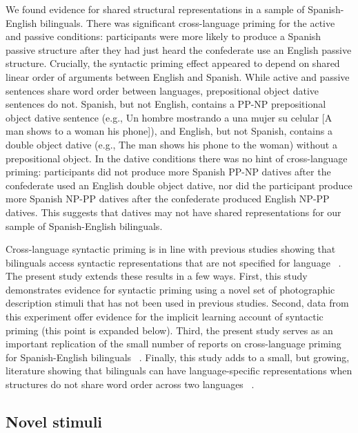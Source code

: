 We found evidence for shared structural representations in a sample of Spanish-English bilinguals. There was significant cross-language priming for the active and passive conditions: participants were more likely to produce a Spanish passive structure after they had just heard the confederate use an English passive structure. Crucially, the syntactic priming effect appeared to depend on shared linear order of arguments between English and Spanish. While active and passive sentences share word order between languages, prepositional object dative sentences do not. Spanish, but not English, contains a PP-NP prepositional object dative sentence (e.g., Un hombre mostrando a una mujer su celular [A man shows to a woman his phone]), and English, but not Spanish, contains a double object dative (e.g., The man shows his phone to the woman) without a prepositional object. In the dative conditions there was no hint of cross-language priming: participants did not produce more Spanish PP-NP datives after the confederate used an English double object dative, nor did the participant produce more Spanish NP-PP datives after the confederate produced English NP-PP datives. This suggests that datives may not have shared representations for our sample of Spanish-English bilinguals. 

Cross-language syntactic priming is in line with previous studies showing that bilinguals access syntactic representations that are not specified for language ~\citep[e.g.,][]{Loebell2003,Hartsuiker2004}. The present study extends these results in a few ways. First, this study demonstrates evidence for syntactic priming using a novel set of photographic description stimuli that has not been used in previous studies. Second, data from this experiment offer evidence for the implicit learning account of syntactic priming (this point is expanded below). Third, the present study serves as an important replication of the small number of reports on cross-language priming for Spanish-English bilinguals ~\citep{Flett2003,Hartsuiker2004,Meijer2003}. Finally, this study adds to a small, but growing, literature showing that bilinguals can have language-specific representations when structures do not share word order across two languages ~\citep{Bernolet2007, Loebell2003, Salamoura2007}.

\subsection{Novel stimuli}
\label{novelstimuli}

